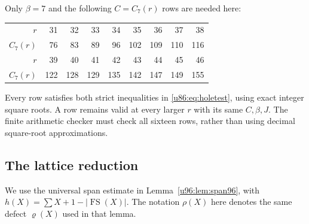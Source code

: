 \documentclass[11pt,a4paper]{article}
\theoremstyle{remark}
\newcommand{\FS}{\operatorname{FS}}
\newcommand{\rhoD}{\varrho}
\begin{document}
Only $\beta=7$ and the following $C=C_7(r)$ rows are needed here:
\begin{center}\small
\begin{tabular}{rrrrrrrrr}
\toprule
$r$&31&32&33&34&35&36&37&38\\
$C_7(r)$&76&83&89&96&102&109&110&116\\\midrule
$r$&39&40&41&42&43&44&45&46\\
$C_7(r)$&122&128&129&135&142&147&149&155\\\bottomrule
\end{tabular}
\end{center}
Every row satisfies both strict inequalities in \eqref{u86:eq:holetest},
using exact integer square roots. A row remains valid at every larger
$r$ with its same $C,\beta,J$. The finite arithmetic checker must check
all sixteen rows, rather than using decimal square-root approximations.

\subsection{The lattice reduction}
We use the universal span estimate in Lemma~\ref{u96:lem:span96},
with $h(X)=\sum X+1-|\FS(X)|$. The notation $\rho(X)$ here denotes
the same defect $\rhoD(X)$ used in that lemma.
\end{document}
